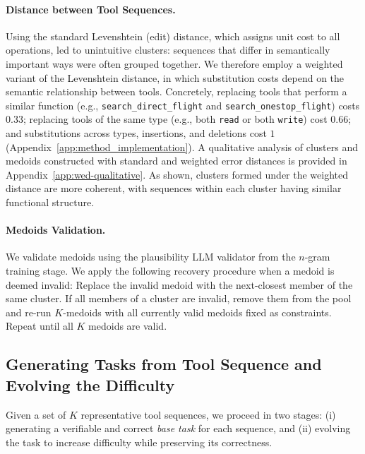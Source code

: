 \paragraph{Distance between Tool Sequences.} Using the standard Levenshtein (edit) distance, which assigns unit cost to all operations, led to unintuitive clusters: sequences that differ in semantically important ways were often grouped together. We therefore employ a weighted variant of the Levenshtein distance, in which substitution costs depend on the semantic relationship between tools. Concretely, replacing tools that perform a similar function (e.g., \texttt{search\_direct\_flight} and \texttt{search\_onestop\_flight}) costs $0.33$; replacing tools of the same type (e.g., both \texttt{read} or both \texttt{write}) cost $0.66$; and substitutions across types, insertions, and deletions cost $1$ (Appendix~\ref{app:method_implementation}). A qualitative analysis of clusters and medoids constructed with standard and weighted error distances is provided in Appendix~\ref{app:wed-qualitative}. As shown, clusters formed under the weighted distance are more coherent, with sequences within each cluster having similar functional structure.

\paragraph{Medoids Validation.} We validate medoids using the plausibility LLM validator from the $n$-gram training stage. We apply the following recovery procedure when a medoid is deemed invalid: Replace the invalid medoid with the next-closest member of the same cluster. If all members of a cluster are invalid, remove them from the pool and re-run $K$-medoids with all currently valid medoids fixed as constraints. Repeat until all $K$ medoids are valid.

\subsection{Generating Tasks from Tool Sequence and Evolving the Difficulty}
\label{sub:task_generation}

Given a set of $K$ representative tool sequences, we proceed in two stages: (i) generating a verifiable and correct \emph{base task} for each sequence, and (ii) evolving the task to increase difficulty while preserving its correctness.

